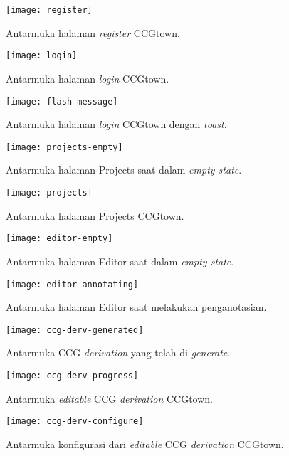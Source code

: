 \begin{figure}\centering
  \texttt{[image: register]}
  \caption{Antarmuka halaman \textit{register} CCGtown.}
  \label{ui:register}
\end{figure}

\begin{figure}\centering
  \texttt{[image: login]}
  \caption{Antarmuka halaman \textit{login} CCGtown.}
  \label{ui:login}
\end{figure}

\begin{figure}\centering
  \texttt{[image: flash-message]}
  \caption{Antarmuka halaman \textit{login} CCGtown dengan \textit{toast}.}
  \label{ui:flash-message}
\end{figure}

\begin{figure}\centering
  \texttt{[image: projects-empty]}
  \caption{Antarmuka halaman Projects saat dalam \textit{empty state}.}
  \label{ui:projects-empty}
\end{figure}

\begin{figure}\centering
  \texttt{[image: projects]}
  \caption{Antarmuka halaman Projects CCGtown.}
  \label{ui:projects}
\end{figure}

\begin{figure}\centering
  \texttt{[image: editor-empty]}
  \caption{Antarmuka halaman Editor saat dalam \textit{empty state}.}
  \label{ui:editor-empty}
\end{figure}

\begin{figure}\centering
  \texttt{[image: editor-annotating]}
  \caption{Antarmuka halaman Editor saat melakukan penganotasian.}
  \label{ui:editor-annotating}
\end{figure}

\begin{figure}\centering
  \texttt{[image: ccg-derv-generated]}
  \caption{Antarmuka CCG \textit{derivation} yang telah di-\textit{generate}.}
  \label{ui:deriv-generated}
\end{figure}

\begin{figure}\centering
  \texttt{[image: ccg-derv-progress]}
  \caption{Antarmuka \textit{editable} CCG \textit{derivation} CCGtown.}
  \label{ui:deriv-progress}
\end{figure}

\begin{figure}\centering
  \texttt{[image: ccg-derv-configure]}
  \caption{Antarmuka konfigurasi dari \textit{editable} CCG \textit{derivation} CCGtown.}
  \label{ui:deriv-configure}
\end{figure}
